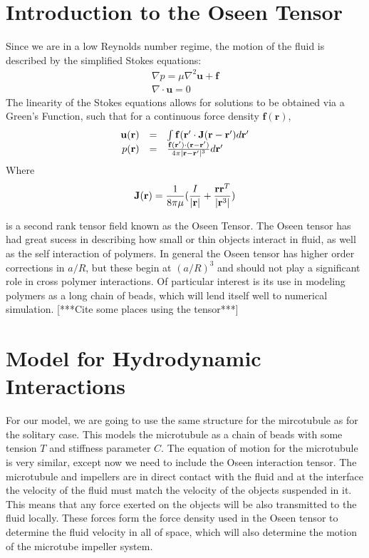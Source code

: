 \documentclass[11pt]{ucthesis}
\def\br{{\bf r}}
\begin{document}
\section{Introduction to the Oseen Tensor}
Since we are in a low Reynolds number regime, the motion of the fluid is described by the simplified Stokes equations:
\begin{equation}
\begin{array}{l}
\nabla p = \mu \nabla^2 \mathbf{u} +  \mathbf{f} \\
\nabla \cdot  \mathbf{u} = 0
\end{array}
\end{equation}
The linearity of the Stokes equations allows for solutions to be obtained via a Green's Function, such that for a continuous force density $ \mathbf{f}( \mathbf{r})$,
\begin{equation}
\label{eq:fluidgreensfunc}
\begin{array}{rcl}
 \mathbf{u}(\br ) &=& \int  \mathbf{f}(\br^\prime \cdot  \mathbf{J} (\br - \br^\prime) d\br^\prime \\
p(\br) &=& \frac{ \mathbf{f}(\br^\prime) \cdot (\br - \br^\prime)}{4 \pi | \br - \br^\prime|^3} d\br^\prime
\end{array}
\end{equation}
Where 
\begin{equation}
\label{eq:oseentensordef}
 \mathbf{J}(\br) = \frac{1}{8\pi\mu} ( \frac{I}{|\br|} + \frac{\br\br^T}{|\br^3|})
\end{equation}

is a second rank tensor field known as the Oseen Tensor.
The Oseen tensor has had great sucess in describing how small or thin objects interact in fluid, as well as the self interaction of polymers. 
In general the Oseen tensor has higher order corrections in $a/R$, but these begin at $(a/R)^3$ and should not play a significant role in cross polymer interactions.
Of particular interest is its use in modeling polymers as a long chain of beads, which will lend itself well to numerical simulation.
[***Cite some places using the tensor***]

\section{Model for Hydrodynamic Interactions}
For our model, we are going to use the same structure for the mircotubule as for the solitary case. This models the microtubule as a chain of beads with some tension $T$ and stiffness parameter $C$. The equation of motion for the microtubule is very similar, except now we need to include the Oseen interaction tensor.
The microtubule and impellers are in direct contact with the fluid and at the interface the velocity of the fluid must match the velocity of the objects suspended in it.
This means that any force exerted on the objects will be also transmitted to the fluid locally. 
These forces form the force density used in the Oseen tensor to determine the fluid velocity in all of space, which will also determine the motion of the microtube impeller system.
\end{document}

